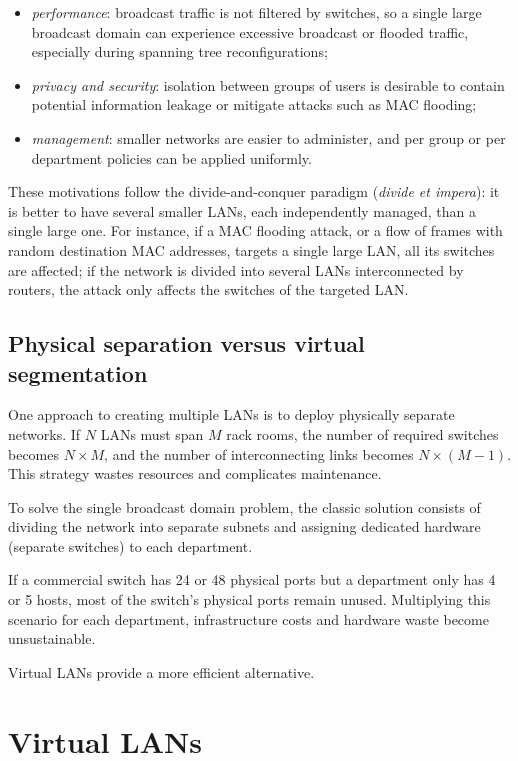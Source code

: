\begin{itemize}
\item \emph{performance}: broadcast traffic is not filtered by switches, so a single large broadcast domain can experience excessive broadcast or flooded traffic, especially during spanning tree reconfigurations;
\item \emph{privacy and security}: isolation between groups of users is desirable to contain potential information leakage or mitigate attacks such as MAC flooding;
\item \emph{management}: smaller networks are easier to administer, and per group or per department policies can be applied uniformly.
\end{itemize}

These motivations follow the divide-and-conquer paradigm (\emph{divide et impera}): it is better to have several smaller LANs, each independently managed, than a single large one. For instance, if a MAC flooding attack, or a flow of frames with random destination MAC addresses, targets a single large LAN, all its switches are affected; if the network is divided into several LANs interconnected by routers, the attack only affects the switches of the targeted LAN.

\subsection{Physical separation versus virtual segmentation}

One approach to creating multiple LANs is to deploy physically separate networks. If \(N\) LANs must span \(M\) rack rooms, the number of required switches becomes \(N \times M\), and the number of interconnecting links becomes \(N \times (M - 1)\). This strategy wastes resources and complicates maintenance.

To solve the single broadcast domain problem, the classic solution consists of dividing the network into separate subnets and assigning dedicated hardware (separate switches) to each department.

If a commercial switch has 24 or 48 physical ports but a department only has 4 or 5 hosts, most of the switch's physical ports remain unused. Multiplying this scenario for each department, infrastructure costs and hardware waste become unsustainable.

Virtual LANs provide a more efficient alternative.

\section{Virtual LANs}
